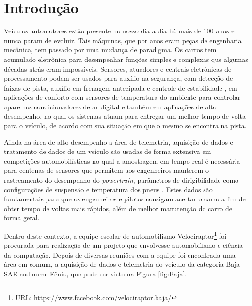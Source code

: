 \chapter{Introdução} 
	\label{ch:introducao}

Veículos automotores estão presente no nosso dia a dia há mais de 100 anos \cite{fordt} e nunca param de evoluir. Tais  máquinas, que por anos eram peças de engenharia mecânica, tem passado por uma mudança de paradigma. Os carros tem acumulado eletrônica para desempenhar funções simples e complexas que algumas décadas atrás eram impossíveis. Sensores, atuadores e centrais eletrônicas de processamento podem ser usados para auxílio na segurança, com detecção de faixas de pista, auxílio em frenagem antecipada e controle de estabilidade \cite{racecarInstrumentationFor2012}, em aplicações de conforto com sensores de temperatura do ambiente para controlar aparelhos condicionadores de ar digital e também em aplicações de alto desempenho, no qual os sistemas atuam para entregar um melhor tempo de volta para o veículo, de acordo com sua situação em que o mesmo se encontra na pista.

Ainda na área de alto desempenho a área de telemetria, aquisição de dados e tratamento de dados de um veículo são usadas de forma extensiva em competições automobilísticas no qual a amostragem em tempo real é necessária para centenas de sensores que permitem aos engenheiros manterem o rastreamento do desempenho do \textit{powertrain}, parâmetros de dirigibilidade como configurações de suspensão e temperatura dos pneus \cite{designAndImplementation2015}. Estes dados são fundamentais para que os engenheiros e pilotos consigam acertar o carro a fim de obter tempo de voltas mais rápidos, além de melhor manutenção do carro de forma geral.

Dentro deste contexto, a equipe escolar de automobilismo Velociraptor\footnote{URL: \url{https://www.facebook.com/velociraptor.baja/}} foi procurada para realização de um projeto que envolvesse automobilismo e ciência da computação. Depois de diversas reuniões com a equipe foi encontrada uma área em comum, a aquisição de dados e telemetria do veículo da categoria Baja SAE codinome Fênix, que pode ser visto na Figura \ref{fig:Baja}. 


